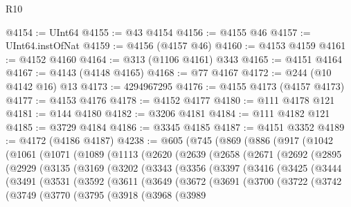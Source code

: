 \begin{lexlean}{R10}
\begin{coremodule}
{{{{{{{{{{{{{{{{{{{{{{{{{{{{{{{{{{{{{{{{{{{{{{{{{{{{{{{{{{{{{{{{{{{{{{{{{{{{{{{{{{{{{{{{{{{{{{{{{{{{{{{{{{{{@4154 := UInt64
@4155 := @43 @4154
@4156 := @4155 @46
@4157 := UInt64.instOfNat
@4159 := @4156 (@4157 @46)
@4160 := @4153 @4159
@4161 := @4152 @4160
@4164 := @313 (@1106 @4161) @343
@4165 := @4151 @4164
@4167 := @4143 (@4148 @4165)
@4168 := @77 @4167
@4172 := @244 (@10 @4142 @16) @13
@4173 := 4294967295
@4176 := @4155 @4173 (@4157 @4173)
@4177 := @4153 @4176
@4178 := @4152 @4177
@4180 := @111 @4178 @121
@4181 := @144 @4180
@4182 := @3206 @4181
@4184 := @111 @4182 @121
@4185 := @3729 @4184
@4186 := @3345 @4185
@4187 := @4151 @3352
@4189 := @4172 (@4186 @4187)
@4238 := @605
    (@745
      (@869
        (@886
          (@917
            (@1042
              (@1061
                (@1071
                  (@1089
                    (@1113
                      (@2620
                        (@2639
                          (@2658
                            (@2671
                              (@2692
                                (@2895
                                  (@2929
                                    (@3135
                                      (@3169
                                        (@3202
                                          (@3343
                                            (@3356
                                              (@3397
                                                (@3416
                                                  (@3425
                                                    (@3444
                                                      (@3491
                                                        (@3531
                                                          (@3592
                                                            (@3611
                                                              (@3649
                                                                (@3672
                                                                  (@3691
                                                                    (@3700
                                                                      (@3722
                                                                        (@3742
                                                                          (@3749
                                                                            (@3770
                                                                              (@3795
                                                                                (@3918
                                                                                  (@3968
                                                                                    (@3989
}}}}}}}}}}}}}}}}}}}}}}}}}}}}}}}}}}}}}}}}}}}}}}}}}}}}}}}}}}}}}}}}}}}}}}}}}}}}}}}}}}}}}}}}}}}}}}}}}}}}}}}}}}}}
\end{coremodule}
\end{lexlean}
